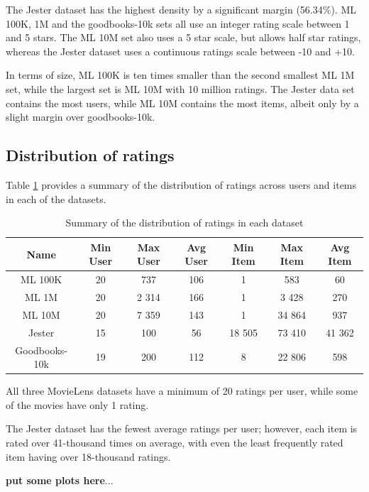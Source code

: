 The Jester dataset has the highest density by a significant margin (56.34\%). ML 100K, 1M and the goodbooks-10k sets all use an integer rating scale between 1 and 5 stars. The ML 10M set also uses a 5 star scale, but allows half star ratings, whereas the Jester dataset uses a continuous ratings scale between -10 and +10.

In terms of size, ML 100K is ten times smaller than the second smallest ML 1M set, while the largest set is ML 10M with 10 million ratings. The Jester data set contains the most users, while ML 10M contains the most items, albeit only by a slight margin over goodbooks-10k.

\subsection{Distribution of ratings}
Table \ref{tab:ratings-distribution} provides a summary of the distribution of ratings across users and items in each of the datasets.

\begin{table}[H]
\caption[Ratings distribution]{Summary of the distribution of ratings in each dataset}
\label{tab:ratings-distribution}
\centering
\begin{tabular}{c | c | c | c | c | c | c}
\toprule
\textbf{Name} & \textbf{Min User} & \textbf{Max User} & \textbf{Avg User} & \textbf{Min Item} & \textbf{Max Item} & \textbf{Avg Item} \\
\midrule
ML 100K & 20 & 737 & 106 & 1 & 583 & 60 \\
ML 1M & 20 & 2 314 & 166 & 1 & 3 428 & 270 \\
ML 10M & 20 & 7 359 & 143 & 1 & 34 864 & 937 \\
Jester & 15 & 100 & 56 & 18 505 & 73 410 & 41 362 \\
Goodbooks-10k & 19 & 200 & 112 & 8 & 22 806 & 598 \\
\bottomrule
\end{tabular}
\end{table}

All three MovieLens datasets have a minimum of 20 ratings per user, while some of the movies have only 1 rating.

The Jester dataset has the fewest average ratings per user; however, each item is rated over 41-thousand times on average, with even the least frequently rated item having over 18-thousand ratings.

\textbf{put some plots here}...

